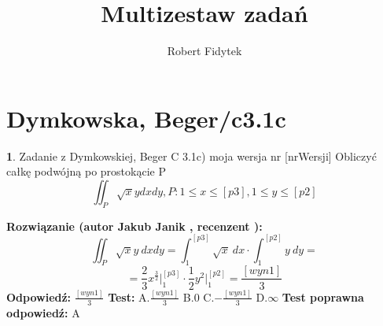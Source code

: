 \documentclass[12pt, a4paper]{article}
\title{Multizestaw zadań}
\author{Robert Fidytek}
\date{}
\theoremstyle{definition} %
\newtheorem{zad}{}
\newcommand{\kategoria}[1]{\section{#1}} %
\newcommand{\zadStart}[1]{\begin{zad}#1\newline} %
\newcommand{\zadStop}{\end{zad}}   %
\newcommand{\rozwStart}[2]{\noindent \textbf{Rozwiązanie (autor #1 , recenzent #2): }\newline} %
\newcommand{\rozwStop}{\newline}                                            %
\newcommand{\odpStart}{\noindent \textbf{Odpowiedź:}\newline}    %
\newcommand{\odpStop}{\newline}                                             %
\newcommand{\testStart}{\noindent \textbf{Test:}\newline} %
\newcommand{\testStop}{\newline} %
\newcommand{\kluczStart}{\noindent \textbf{Test poprawna odpowiedź:}\newline} %
\newcommand{\kluczStop}{\newline} %
\begin{document}
\maketitle


\kategoria{Dymkowska, Beger/c3.1c}
\zadStart{Zadanie z Dymkowskiej, Beger C 3.1c) moja wersja nr [nrWersji]}
Obliczyć całkę podwójną po prostokącie P $$\iint_P \sqrt{x}y dxdy, P: 1\leq x \leq [p3], 1 \leq y \leq [p2]$$
\zadStop
\rozwStart{Jakub Janik}{}
$$\iint_P \sqrt{x}y\ dxdy=\int_1^{[p3]}\sqrt{x}\ dx\cdot \int_1^{[p2]} y\ dy=$$
$$=\frac{2}{3}x^{\frac{3}{2}}\Big|_1^{[p3]}\cdot \frac{1}{2}y^2\Big|_1^{[p2]}=\frac{[wyn1]}{3}$$
\rozwStop
\odpStart
$\frac{[wyn1]}{3}$
\odpStop
\testStart
A.$\frac{[wyn1]}{3}$
B.$0$
C.$-\frac{[wyn1]}{3}$
D.$\infty$
\testStop
\kluczStart
A
\kluczStop
\end{document}
